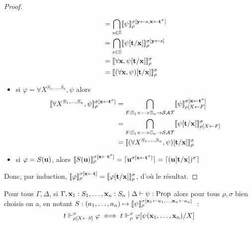 \documentclass{article}
\begin{document}
\begin{proof}
\begin{itemize}
\begin{align*}
      &= \bigcap_{s\in\mathbb{S}}\llbracket \psi \rrbracket_\rho^{\sigma[\mathbf{y}\leftarrow s, \mathbf{x}\leftarrow \mathbf{t}^\sigma]}\\
      &= \bigcap_{s\in\mathbb{S}}\llbracket \psi[\mathbf{t}/\mathbf{x}] \rrbracket_\rho^{\sigma[\mathbf{y}\leftarrow s]}\\
      &= \llbracket \forall \mathbf{x}, \psi[\mathbf{t}/\mathbf{x}] \rrbracket_\rho^\sigma\\
      &= \llbracket (\forall \mathbf{x}, \psi)[\mathbf{t}/\mathbf{x}] \rrbracket_\rho^\sigma
    \end{align*}
  \item si $\varphi = \forall X^{S_1,\ldots,S_n}, \psi$ alors
    \begin{align*}
      \llbracket \forall X^{S_1,\ldots,S_n}, \psi \rrbracket_\rho^{\sigma[\mathbf{x}\leftarrow \mathbf{t}^\sigma]} &= \bigcap_{F : \mathbb{S}_1\times\cdots\times \mathbb{S}_n\to \mathcal {SAT}}\llbracket \psi \rrbracket_{\rho[X\leftarrow F]}^{\sigma[\mathbf{x}\leftarrow \mathbf{t}^\sigma]}\\
      &= \bigcap_{F : \mathbb{S}_1\times\cdots\times \mathbb{S}_n \to \mathcal {SAT}}\llbracket \psi[\mathbf{t}/\mathbf{x}] \rrbracket_{\rho[X\leftarrow F]}^\sigma\\
      &= \llbracket (\forall X^{S_1,\ldots,S_n}, \psi)[\mathbf{t}/\mathbf{x}] \rrbracket_\rho^\sigma
    \end{align*}
  \item si $\varphi = S(\mathbf{u})$, alors $\llbracket S(\mathbf{u}) \rrbracket_\rho^{\sigma[\mathbf{x}\leftarrow \mathbf{t}^\sigma]} = \lceil \mathbf{u}^{\sigma[\mathbf{x}\leftarrow\mathbf{t}^\sigma]} \rceil = \lceil (\mathbf{u}[\mathbf{t}/\mathbf{x}])^\sigma \rceil$
  \end{itemize}
  Donc, par induction, $\llbracket \varphi \rrbracket_\rho^{\sigma[\mathbf{x}\leftarrow\mathbf{t}]} = \llbracket \varphi[\mathbf{t}/\mathbf{x}] \rrbracket_\rho^\sigma$, d'où le résultat.
\end{proof}

\begin{lem}
  Pour tous $\Gamma,\Delta$, si $\Gamma,\mathbf{x}_1 : S_1,\ldots,\mathbf{x}_n : S_n\mid\Delta\vdash \psi : \mathrm{Prop}$ alors pour tous $\rho,\sigma$ bien choisis on a, en notant $S : (a_1,\ldots,a_n) \mapsto \llbracket \psi \rrbracket_\rho^{\sigma[\mathbf{x}_1\leftarrow a_1,\ldots,\mathbf{x}_n\leftarrow a_n]}$~:
  \[t\Vdash_{\rho[X\leftarrow S]}^\sigma \varphi \iff t\Vdash_\rho^\sigma \varphi[\psi(\mathbf{x}_1,\ldots,\mathbf{x}_n)/X]\]
\end{lem}
\end{document}
